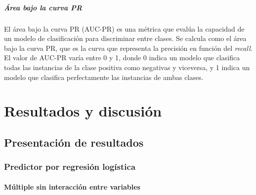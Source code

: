 \documentclass[a4paper]{report}
\begin{document}
\paragraph{Área bajo la curva PR}
El área bajo la curva PR (AUC-PR) es una métrica que evalúa la capacidad de un modelo de clasificación para discriminar entre clases.
Se calcula como el área bajo la curva PR, que es la curva que representa la precisión en función del \emph{recall}.
El valor de AUC-PR varía entre 0 y 1, donde 0 indica un modelo que clasifica todas las instancias de la clase positiva como negativas y viceversa, y 1 indica un modelo que clasifica perfectamente las instancias de ambas clases.

%


\chapter{Resultados y discusión}

\section{Presentación de resultados}

\subsection{Predictor por regresión logística}

\subsubsection*{Múltiple sin interacción entre variables}
\end{document}
